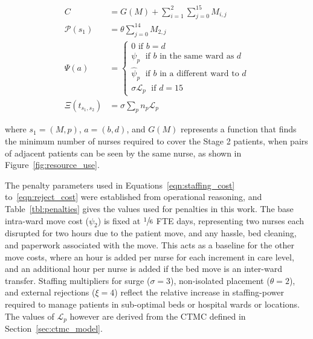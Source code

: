 \documentclass{article}
\begin{document}
\begin{align}
C &= G(M) + \sum_{i=1}^{2} \sum_{j=0}^{15} M_{i,j} \label{eqn:staffing_cost} \\[4mm]
\mathcal{P}(s_1) &= \theta \sum_{j=0}^{14} M_{2,j} \label{eqn:penalty_cost} \\[4mm]
\Psi(a) &= \begin{cases}
0 \text{ if } b = d \\
\psi_p \; \text{ if } b \text{ in the same ward as } d \\
\hat{\psi}_p \; \text{ if } b \text{ in a different ward to } d \\
\sigma \mathcal{L}_p \; \text{ if } d = 15
\end{cases} \label{eqn:move_cost} \\[4mm]
\Xi(t_{s_1, s_2}) &= \sigma \sum_p n_p \mathcal{L}_p \label{eqn:reject_cost}
\end{align}

where $s_1 = (M, p)$, $a = (b, d)$, and $G(M)$ represents a function that finds
the minimum number of nurses required to cover the Stage 2 patients, when pairs
of adjacent patients can be seen by the same nurse, as shown in
Figure~\ref{fig:resource_use}.

The penalty parameters used in Equations~\ref{eqn:staffing_cost}
to~\ref{eqn:reject_cost} were established from operational reasoning, and
Table~\ref{tbl:penalties} gives the values used for penalties in this work.
The base intra-ward move cost ($\psi_2$) is fixed at $\sfrac{1}{6}$ FTE days,
representing two nurses each disrupted for two hours due to the patient move,
and any hassle, bed cleaning, and paperwork associated with the move.
This acts as a baseline for the other move costs, where an hour is added per
nurse for each increment in care level, and an additional hour per nurse is
added if the bed move is an inter-ward transfer.
Staffing multipliers for surge ($\sigma = 3$), non-isolated placement
($\theta = 2$), and external rejections ($\xi = 4$) reflect the relative
increase in staffing-power required to manage patients in sub-optimal beds or
hospital wards or locations.
The values of $\mathcal{L}_p$ however are derived from the CTMC defined in
Section~\ref{sec:ctmc_model}.
\end{document}
